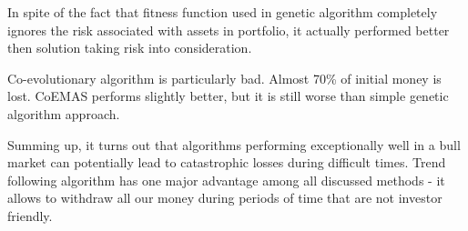 In spite of the fact that fitness function used in genetic algorithm completely ignores the risk associated with assets in portfolio,       it actually performed better then solution taking risk into consideration.

Co-evolutionary algorithm is particularly bad. 
Almost 70\% of initial money is lost. CoEMAS performs slightly better, but it is still worse than simple genetic algorithm approach.

Summing up, it turns out that algorithms performing exceptionally well in a bull market can potentially lead to catastrophic losses during
difficult times. 
Trend following algorithm has one major advantage among all discussed methods - it allows to withdraw all our money during periods of time
that are not investor friendly.
